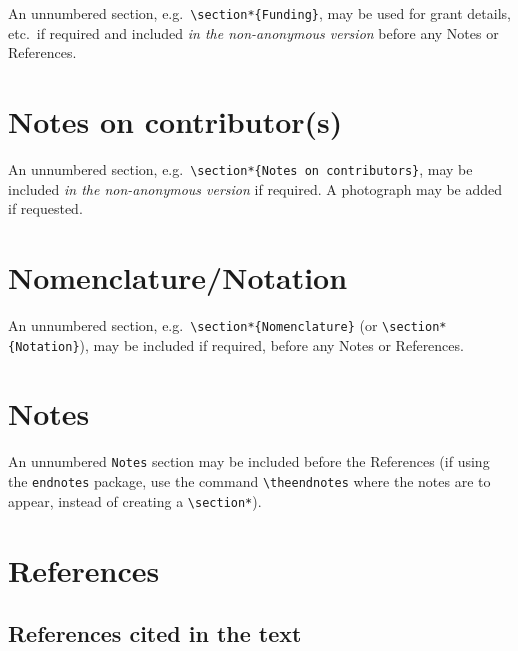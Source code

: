 \documentclass[]{interact}
\theoremstyle{plain}%
\theoremstyle{definition}
\theoremstyle{remark}
\begin{document}
An unnumbered section, e.g.~\texttt{\textbackslash{}section*\{Funding\}}, may be used for grant details, etc.~if required and included \emph{in the non-anonymous version} before any Notes or References.

\hypertarget{notes-on-contributors}{%
\section*{Notes on contributor(s)}\label{notes-on-contributors}}

An unnumbered section, e.g.~\texttt{\textbackslash{}section*\{Notes\ on\ contributors\}}, may be included \emph{in the non-anonymous version} if required. A photograph may be added if requested.

\hypertarget{nomenclaturenotation}{%
\section*{Nomenclature/Notation}\label{nomenclaturenotation}}

An unnumbered section, e.g.~\texttt{\textbackslash{}section*\{Nomenclature\}} (or \texttt{\textbackslash{}section*\{Notation\}}), may be included if required, before any Notes or References.

\hypertarget{notes}{%
\section*{Notes}\label{notes}}

An unnumbered \texttt{Notes} section may be included before the References (if using the \texttt{endnotes} package, use the command \texttt{\textbackslash{}theendnotes} where the notes are to appear, instead of creating a \texttt{\textbackslash{}section*}).

\hypertarget{references}{%
\section{References}\label{references}}

\hypertarget{references-cited-in-the-text}{%
\subsection{References cited in the text}\label{references-cited-in-the-text}}
\end{document}

